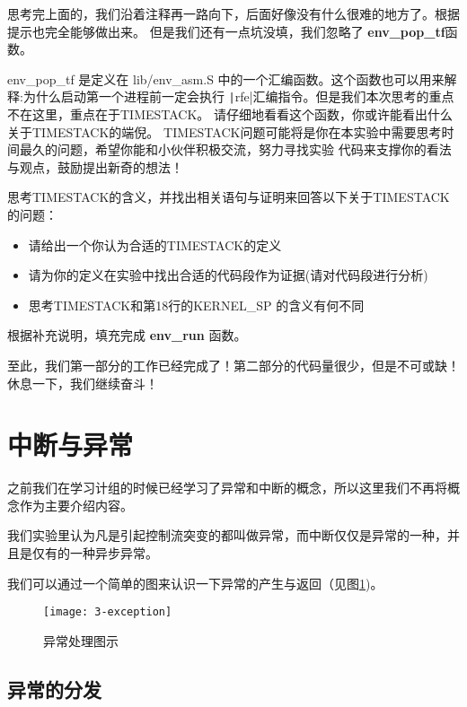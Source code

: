 思考完上面的，我们沿着注释再一路向下，后面好像没有什么很难的地方了。根据提示也完全能够做出来。
但是我们还有一点坑没填，我们忽略了 \textbf{env\_pop\_tf}函数。

env\_pop\_tf 是定义在 lib/env\_asm.S 中的一个汇编函数。这个函数也可以用来解释:为什么启动第一个进程前一定会执行
\texttt|rfe|汇编指令。但是我们本次思考的重点不在这里，重点在于TIMESTACK。
请仔细地看看这个函数，你或许能看出什么关于TIMESTACK的端倪。
TIMESTACK问题可能将是你在本实验中需要思考时间最久的问题，希望你能和小伙伴积极交流，努力寻找实验
代码来支撑你的看法与观点，鼓励提出新奇的想法！

\begin{thinking}\label{think-TIMESTACK}
思考TIMESTACK的含义，并找出相关语句与证明来回答以下关于TIMESTACK的问题：
\begin{itemize}
  \item 请给出一个你认为合适的TIMESTACK的定义
  \item 请为你的定义在实验中找出合适的代码段作为证据(请对代码段进行分析)
  \item 思考TIMESTACK和第18行的KERNEL\_SP 的含义有何不同
\end{itemize}
\end{thinking}

\begin{exercise}
根据补充说明，填充完成 \textbf{env\_run} 函数。
\end{exercise}

至此，我们第一部分的工作已经完成了！第二部分的代码量很少，但是不可或缺！休息一下，我们继续奋斗！

\section{中断与异常}

之前我们在学习计组的时候已经学习了异常和中断的概念，所以这里我们不再将概念作为主要介绍内容。
\begin{note}
我们实验里认为凡是引起控制流突变的都叫做异常，而中断仅仅是异常的一种，并且是仅有的一种异步异常。
\end{note}

我们可以通过一个简单的图来认识一下异常的产生与返回（见图\ref{fig:3-exception})。
\begin{figure}[htbp]
  \centering
  \texttt{[image: 3-exception]}
  \caption{异常处理图示}\label{fig:3-exception} 
\end{figure}

\subsection{异常的分发}

